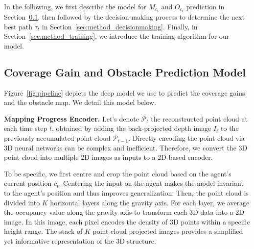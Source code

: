 In the following, we first describe the model for $M_{c_t}$ and $O_{c_t}$ prediction in Section~\ref{sec:method_model}, then followed by the decision-making process to determine the next best path $\tau_t$ in Section~\ref{sec:method_decisionmaking}. Finally, in Section~\ref{sec:method_training}, we introduce the training algorithm for our model.

\subsection{Coverage Gain and Obstacle Prediction Model} 
\label{sec:method_model} 

Figure~\ref{fig:pipeline} depicts the deep model we use to predict the coverage gains and the obstacle map. We detail this model below.

\noindent \textbf{Mapping Progress Encoder.} 
%
Let's denote $\mathcal{P}_t$ the reconstructed point cloud at each time step $t$, obtained by adding the back-projected depth image $I_t$ to the previously accumulated point cloud $\mathcal{P}_{t-1}$.
Directly encoding the point cloud via 3D neural networks can be complex and inefficient. Therefore, we convert the 3D point cloud into multiple 2D images as inputs to a 2D-based encoder.

To be specific, we first centre and crop the point cloud based on the agent's current position $c_t$. Centering the input on the agent makes the model invariant to the agent's position and thus improves generalization.
Then, the point cloud is divided into $K$ horizontal layers along the gravity axis. For each layer, we average the occupancy value along the gravity axis to transform each 3D data into a 2D image. In this image, each pixel encodes the density of 3D points within a specific height range. The stack of $K$ point cloud projected images provides a simplified yet informative representation of the 3D structure.  



